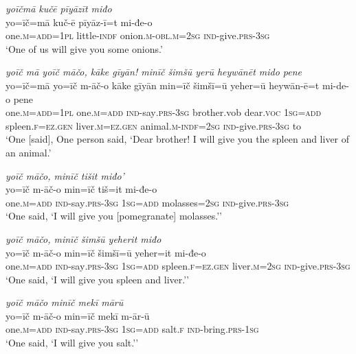 \ea \label{ŽP.229}
\textit{yoīčmā kučē pīyāzīt miđo} \\ 
\gll yo=īč=mā kuč-ē pīyāz-ī=t mi-đe-o \\ 
 one\textsc{.m}\textsc{=add}\textsc{=1pl} little\textsc{-indf} onion\textsc{.m}\textsc{-obl}\textsc{.m}\textsc{=\textsc{2sg}} \textsc{ind-}give\textsc{.prs}\textsc{-3sg} \\ 
\glt `One of us will give you some onions.'
\z 
 
\ea \label{ŽP.230}
\textit{yoīč mā yoīč māčo, kāke gīyān! minīč šimšū yerū heywānēt mido pene} \\ 
\gll yo=īč=mā yo=īč m-āč-o kāke gīyān min=īč šimšī=ū yeher=ū heywān-ē=t mi-de-o pene \\ 
 one\textsc{.m}\textsc{=add}\textsc{=1pl} one\textsc{.m}\textsc{=add} \textsc{ind-}say\textsc{.prs}\textsc{-3sg} brother.vob dear.\textsc{voc} \textsc{1sg}\textsc{=add} spleen\textsc{.f}\textsc{\textsc{=ez.gen}} liver\textsc{.m}\textsc{\textsc{=ez.gen}} animal\textsc{.m}\textsc{-indf}\textsc{=\textsc{2sg}} \textsc{ind-}give\textsc{.prs}\textsc{-3sg} to \\ 
\glt `One [said], One person said, ‘Dear brother! I will give you the spleen and liver of an animal.'
\z 
 
\ea \label{ŽP.237}
\textit{yoīč māčo, minīč tišit miđo’} \\ 
\gll yo=īč m-āč-o min=īč tiš=it mi-đe-o \\ 
 one\textsc{.m}\textsc{=add} \textsc{ind-}say\textsc{.prs}\textsc{-3sg} \textsc{1sg}\textsc{=add} molasses\textsc{=\textsc{2sg}} \textsc{ind-}give\textsc{.prs}\textsc{-3sg} \\ 
\glt `One said, ‘I will give you [pomegranate] molasses.’'
\z 
 
\ea \label{ŽP.238}
\textit{yoīč māčo, minīč šimšū yeherit miđo} \\ 
\gll yo=īč m-āč-o min=īč šimšī=ū yeher=it mi-đe-o \\ 
 one\textsc{.m}\textsc{=add} \textsc{ind-}say\textsc{.prs}\textsc{-3sg} \textsc{1sg}\textsc{=add} spleen\textsc{.f}\textsc{\textsc{=ez.gen}} liver\textsc{.m}\textsc{=\textsc{2sg}} \textsc{ind-}give\textsc{.prs}\textsc{-3sg} \\ 
\glt `One said, ‘I will give you spleen and liver.’'
\z 
 
\ea \label{ŽP.239}
\textit{yoīč māčo minīč mekī mārū} \\ 
\gll yo=īč m-āč-o min=īč mekī m-ār-ū \\ 
 one\textsc{.m}\textsc{=add} \textsc{ind-}say\textsc{.prs}\textsc{-3sg} \textsc{1sg}\textsc{=add} salt\textsc{.f} \textsc{ind-}bring\textsc{.prs}\textsc{-\textsc{1sg}} \\ 
\glt `One said, ‘I will give you salt.’'
\z 
 
